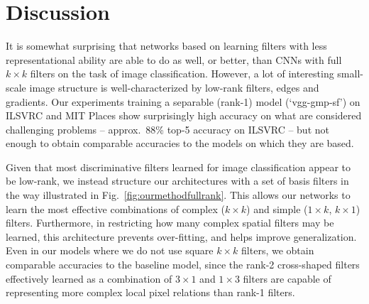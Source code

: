 \documentclass[thesis]{subfiles}
\begin{document}
    \section{Discussion}
    
    It is somewhat surprising that networks based on learning filters with less representational ability are able to do as well, or better, than CNNs with full $k\times k$ filters on the task of image classification. However, a lot of interesting small-scale image structure is well-characterized by low-rank filters, \eg edges and gradients. Our experiments training a separable (rank-1) model (`vgg-gmp-sf') on ILSVRC and MIT Places show surprisingly high accuracy on what are considered challenging problems -- approx.\ 88\% top-5 accuracy on ILSVRC -- but not enough to obtain comparable accuracies to the models on which they are based.
    
    Given that most discriminative filters learned for image classification appear to be low-rank, we instead structure our architectures with a set of basis filters in the way illustrated in Fig.~\ref{fig:ourmethodfullrank}. This allows our networks to learn the most effective combinations of complex (\eg $k\times k$) and simple (\eg $1\times k$, $k\times 1$) filters. Furthermore, in restricting how many complex spatial filters may be learned, this architecture prevents over-fitting, and helps improve generalization. Even in our models where we do not use square $k\times k$ filters, we obtain comparable accuracies to the baseline model, since the rank-2 cross-shaped filters effectively learned as a combination of $3 \times 1$ and $1 \times 3$ filters are capable of representing more complex local pixel relations than rank-1 filters.
    
    
\end{document}
